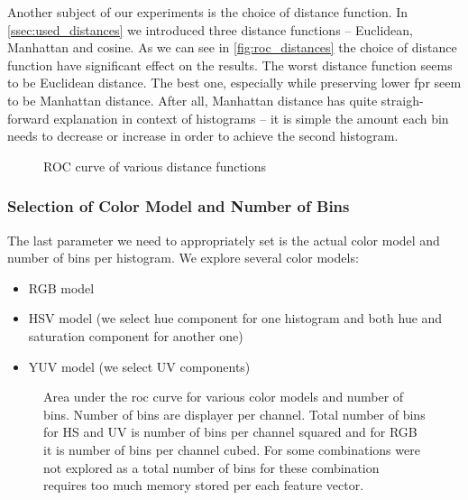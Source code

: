 Another subject of our experiments is the choice of distance function. In
\autoref{ssec:used_distances} we introduced three distance functions --
Euclidean, Manhattan and cosine. As we can see in \autoref{fig:roc_distances}
the choice of distance function have significant effect on the results.
The worst distance function seems to be Euclidean distance. The best one,
especially while preserving lower \gls{fpr} seem to be Manhattan distance.
After all, Manhattan distance has quite straigh-forward explanation in context
of histograms -- it is simple the amount each bin needs to decrease or increase
in order to achieve the second histogram.

\begin{figure}
    \centering
    \def\svgwidth{\columnwidth}
    
    \caption{ROC curve of various distance functions}
    \label{fig:roc_distances}
\end{figure}

\subsubsection{Selection of Color Model and Number of Bins}

The last parameter we need to appropriately set is the actual color model
and number of bins per histogram. We explore several color models:

\begin{itemize}
    \item RGB model
    \item HSV model (we select hue component for one histogram and both hue and saturation component for another one)
    \item YUV model (we select UV components)
\end{itemize}

\begin{figure}
    \centering
    \def\svgwidth{\columnwidth}
    \Large
    \scalebox{0.7}{}
    \caption[Area under the ROC curve for various color models and number of bins]{Area under the \gls{roc} curve for various color models and number of bins. Number of bins are displayer per channel. Total number of bins for HS and UV is number of bins per channel squared and for RGB it is number of bins per channel cubed. For some combinations were not explored as a total number of bins for these combination requires too much memory stored per each feature vector.}
    \label{fig:model_bins}
\end{figure}

